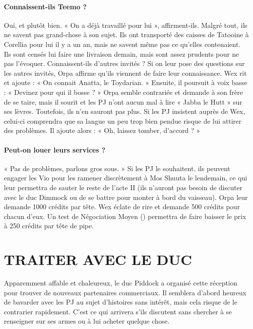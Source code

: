 \documentclass[a4paper,10pt,twoside,twocolumn,openany]{book}
\begin{document}
\paragraph{Connaissent-ils Teemo ?} Oui, et plutôt bien. « On a
déjà travaillé pour lui », affirment-ils. Malgré tout, ils ne
savent pas grand-chose à son sujet. Ils ont transporté
des caisses de Tatooine à Corellia pour lui il y a un an,
mais ne savent même pas ce qu’elles contenaient. Ils
sont censés lui faire une livraison demain, mais sont assez prudents pour ne pas l’évoquer.
Connaissent-ils d’autres invités ? Si on leur pose
des questions sur les autres invités, Orpa affirme qu’ils
viennent de faire leur connaissance. Wex rit et ajoute :
« On connait Anatta, le Toydarian. » Ensuite, il poursuit à
voix basse : « Devinez pour qui il bosse ? » Orpa semble
contrariée et demande à son frère de se taire, mais il sourit et les PJ n’ont aucun mal à lire « Jabba le Hutt » sur ses
lèvres. Toutefois, ils n’en sauront pas plus. Si les PJ insistent
auprès de Wex, celui-ci comprendra que sa langue un peu
trop bien pendue risque de lui attirer des problèmes. Il
ajoute alors : « Oh, laissez tomber, d’accord ? »

\paragraph{Peut-on louer leurs services ?} « Pas de problèmes,
parlons gros sous. » Si les PJ le souhaitent, ils peuvent
engager les Vio pour les ramener discrètement à Mos
Shuuta le lendemain, ce qui leur permettra de sauter
le reste de l’acte II (ils n’auront pas besoin de discuter
avec le duc Dimmock ou de se battre pour monter à
bord du vaisseau). Orpa leur demande 1000 crédits par
tête. Wex éclate de rire et demande 500 crédits pour
chacun d’eux. Un test de Négociation Moyen (\difficulty \difficulty)
permettra de faire baisser le prix à 250 crédits par tête
de pipe.

\section{TRAITER AVEC LE DUC}

Apparemment affable et chaleureux, le duc Piddock a
organisé cette réception pour trouver de nouveaux partenaires commerciaux. Il semblera d’abord heureux de
bavarder avec les PJ au sujet d’histoires sans intérêt,
mais cela risque de le contrarier rapidement. C’est ce qui
arrivera s’ils discutent sans chercher à se renseigner sur
ses armes ou à lui acheter quelque chose.
\end{document}
